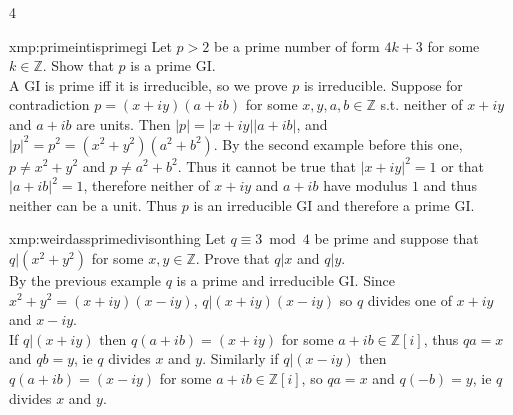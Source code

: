 \documentclass[landscape, 8pt]{extarticle}
\begin{document}
\begin{multicols*}{4}
		
		\begin{xmp}{xmp:primeintisprimegi}{ }
			Let $p>2$ be a prime number of form $4k+3$ for some $k\in \mathbb{Z}$. Show that $p$ is a prime GI.\\
			A GI is prime iff it is irreducible, so we prove $p$ is irreducible. Suppose for contradiction $p = (x+iy)(a+ib)$ for some $x, y, a, b\in \mathbb{Z}$ s.t. neither of $x+iy$ and $a+ib$ are units. Then $\left|p\right| = \left|x+iy\right|\left|a+ib\right|$, and $\left|p\right|^2 = p^2 = (x^2 + y^2)(a^2 + b^2)$. By the second example before this one, $p \ne x^2 + y^2$ and $p \ne a^2 + b^2$. Thus it cannot be true that $\left|x+iy\right|^2 = 1$ or that $\left|a+ib\right|^2 = 1$, therefore neither of $x+iy$ and $a+ib$ have modulus $1$ and thus neither can be a unit. Thus $p$ is an irreducible GI and therefore a prime GI.
		
		\end{xmp}
		
		
		\begin{xmp-s}{xmp:weirdassprimedivisonthing}{ }
			Let $q\equiv 3 \bmod{4}$ be prime and suppose that $q|(x^2 + y^2)$ for some $x, y\in \mathbb{Z}$. Prove that $q|x$ and $q|y$.\\
			By the previous example $q$ is a prime and irreducible GI. Since $x^2 + y^2 = (x+iy)(x-iy)$, $q|(x+iy)(x-iy)$ so $q$ divides one of $x+iy$ and $x-iy$.\\
			If $q|(x+iy)$ then $q(a+ib) = (x+iy)$ for some $a+ib\in \mathbb{Z}[i]$, thus $qa = x$ and $qb = y$, ie $q$ divides $x$ and $y$. Similarly if $q|(x-iy)$ then $q(a+ib) = (x-iy)$ for some $a+ib\in \mathbb{Z}[i]$, so $qa = x$ and $q (-b)=y$, ie $q$ divides $x$ and $y$.
			
		\end{xmp-s}
		
		
		
		
		
		
		
	\end{multicols*}
	
	
\end{document}
